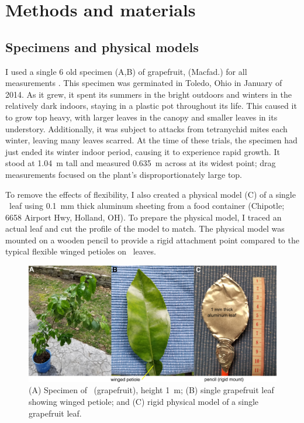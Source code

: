 \section{Methods and materials}
\label{sec:methods}

\subsection{Specimens and physical models}
I used a single \SI{6}{\year} old specimen (A,B) of grapefruit, \Citrusxparadisi (Macfad.) for all measurements \citep{macfayden1837flora}. This specimen was germinated in Toledo, Ohio in January of 2014. As it grew, it spent its summers in the bright outdoors and winters in the relatively dark indoors, staying in a plastic pot throughout its life. This caused it to grow top heavy, with larger leaves in the canopy and smaller leaves in its understory. Additionally, it was subject to attacks from tetranychid mites each winter, leaving many leaves scarred. At the time of these trials, the specimen had just ended its winter indoor period, causing it to experience rapid growth. It stood at \SI{1.04}{\meter} tall and measured \SI{0.635}{\meter} across at its widest point; drag measurements focused on the plant's disproportionately large top.

To remove the effects of flexibility, I also created a physical model (C) of a single \Cxparadisi\ leaf using \SI{0.1}{\milli\meter} thick aluminum sheeting from a food container (Chipotle; 6658 Airport Hwy, Holland, OH). To prepare the physical model, I traced an actual leaf and cut the profile of the model to match. The physical model was mounted on a wooden pencil to provide a rigid attachment point compared to the typical flexible winged petioles on \Cxparadisi\ leaves. 
\begin{figure}
\begin{center}
\includegraphics[width=6in]{figures/fig1.png}
\end{center}
\caption{(A) Specimen of \Citrusxparadisi\ (grapefruit), height \SI{1}{\meter}; (B) single grapefruit leaf showing winged petiole; and (C) rigid physical model of a single grapefruit leaf.}
\label{fig:methods:specimens}
\end{figure}








